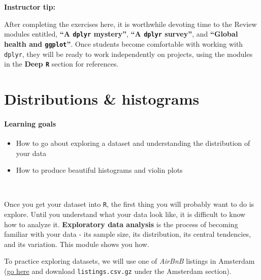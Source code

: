 \documentclass[]{book}
\providecommand{\tightlist}{%
  \setlength{\itemsep}{0pt}\setlength{\parskip}{0pt}}
\begin{document}
\leavevmode\hypertarget{tip-text}{}%
\textbf{Instructor tip:}

After completing the exercises here, it is worthwhile devoting time to the Review modules entitled, \textbf{``A \texttt{dplyr} mystery''}, \textbf{``A \texttt{dplyr} survey''}, and \textbf{``Global health and \texttt{ggplot}''}. Once students become comfortable with working with \texttt{dplyr}, they will be ready to work independently on projects, using the modules in the \textbf{Deep \texttt{R}} section for references.

\hypertarget{distributions-histograms}{%
\chapter{Distributions \& histograms}\label{distributions-histograms}}

\hypertarget{learning-goals-11}{%
\subsubsection*{Learning goals}\label{learning-goals-11}}

\begin{itemize}
\tightlist
\item
  How to go about exploring a dataset and understanding the distribution of your data\\
\item
  How to produce beautiful histograms and violin plots
\end{itemize}

~

Once you get your dataset into \texttt{R}, the first thing you will probably want to do is explore. Until you understand what your data look like, it is difficult to know how to analyze it. \textbf{Exploratory data analysis} is the process of becoming familiar with your data - its sample size, its distribution, its central tendencies, and its variation. This module shows you how.

To practice exploring datasets, we will use one of \emph{AirBnB} listings in Amsterdam (\href{http://insideairbnb.com/get-the-data.html}{go here} and download \texttt{listings.csv.gz} under the Amsterdam section).
\end{document}
